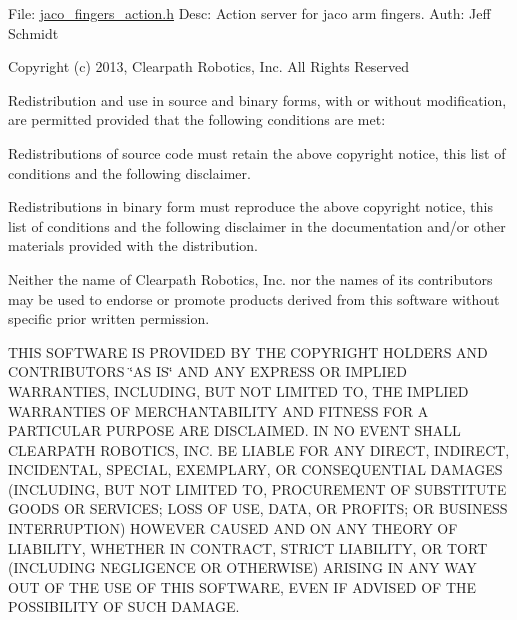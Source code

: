 File\+: \hyperlink{jaco__fingers__action_8h}{jaco\+\_\+fingers\+\_\+action.\+h} Desc\+: Action server for jaco arm fingers. Auth\+: Jeff Schmidt

Copyright (c) 2013, Clearpath Robotics, Inc. All Rights Reserved

Redistribution and use in source and binary forms, with or without modification, are permitted provided that the following conditions are met\+:
\begin{DoxyItemize}
\item Redistributions of source code must retain the above copyright notice, this list of conditions and the following disclaimer.
\item Redistributions in binary form must reproduce the above copyright notice, this list of conditions and the following disclaimer in the documentation and/or other materials provided with the distribution.
\item Neither the name of Clearpath Robotics, Inc. nor the names of its contributors may be used to endorse or promote products derived from this software without specific prior written permission.
\end{DoxyItemize}

T\+H\+IS S\+O\+F\+T\+W\+A\+RE IS P\+R\+O\+V\+I\+D\+ED BY T\+HE C\+O\+P\+Y\+R\+I\+G\+HT H\+O\+L\+D\+E\+RS A\+ND C\+O\+N\+T\+R\+I\+B\+U\+T\+O\+RS \char`\"{}\+A\+S I\+S\char`\"{} A\+ND A\+NY E\+X\+P\+R\+E\+SS OR I\+M\+P\+L\+I\+ED W\+A\+R\+R\+A\+N\+T\+I\+ES, I\+N\+C\+L\+U\+D\+I\+NG, B\+UT N\+OT L\+I\+M\+I\+T\+ED TO, T\+HE I\+M\+P\+L\+I\+ED W\+A\+R\+R\+A\+N\+T\+I\+ES OF M\+E\+R\+C\+H\+A\+N\+T\+A\+B\+I\+L\+I\+TY A\+ND F\+I\+T\+N\+E\+SS F\+OR A P\+A\+R\+T\+I\+C\+U\+L\+AR P\+U\+R\+P\+O\+SE A\+RE D\+I\+S\+C\+L\+A\+I\+M\+ED. IN NO E\+V\+E\+NT S\+H\+A\+LL C\+L\+E\+A\+R\+P\+A\+TH R\+O\+B\+O\+T\+I\+CS, I\+NC. BE L\+I\+A\+B\+LE F\+OR A\+NY D\+I\+R\+E\+CT, I\+N\+D\+I\+R\+E\+CT, I\+N\+C\+I\+D\+E\+N\+T\+AL, S\+P\+E\+C\+I\+AL, E\+X\+E\+M\+P\+L\+A\+RY, OR C\+O\+N\+S\+E\+Q\+U\+E\+N\+T\+I\+AL D\+A\+M\+A\+G\+ES (I\+N\+C\+L\+U\+D\+I\+NG, B\+UT N\+OT L\+I\+M\+I\+T\+ED TO, P\+R\+O\+C\+U\+R\+E\+M\+E\+NT OF S\+U\+B\+S\+T\+I\+T\+U\+TE G\+O\+O\+DS OR S\+E\+R\+V\+I\+C\+ES; L\+O\+SS OF U\+SE, D\+A\+TA, OR P\+R\+O\+F\+I\+TS; OR B\+U\+S\+I\+N\+E\+SS I\+N\+T\+E\+R\+R\+U\+P\+T\+I\+ON) H\+O\+W\+E\+V\+ER C\+A\+U\+S\+ED A\+ND ON A\+NY T\+H\+E\+O\+RY OF L\+I\+A\+B\+I\+L\+I\+TY, W\+H\+E\+T\+H\+ER IN C\+O\+N\+T\+R\+A\+CT, S\+T\+R\+I\+CT L\+I\+A\+B\+I\+L\+I\+TY, OR T\+O\+RT (I\+N\+C\+L\+U\+D\+I\+NG N\+E\+G\+L\+I\+G\+E\+N\+CE OR O\+T\+H\+E\+R\+W\+I\+SE) A\+R\+I\+S\+I\+NG IN A\+NY W\+AY O\+UT OF T\+HE U\+SE OF T\+H\+IS S\+O\+F\+T\+W\+A\+RE, E\+V\+EN IF A\+D\+V\+I\+S\+ED OF T\+HE P\+O\+S\+S\+I\+B\+I\+L\+I\+TY OF S\+U\+CH D\+A\+M\+A\+GE.

